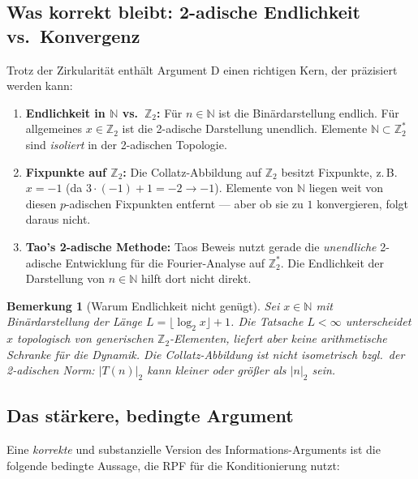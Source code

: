\documentclass[12pt,a4paper]{article}
\newtheorem{bemerkung}[definition]{Bemerkung}
\newcommand{\N}{\mathbb{N}}
\newcommand{\Ztwo}{\mathbb{Z}_2}
\begin{document}
\subsection{Was korrekt bleibt: 2-adische Endlichkeit vs.\ Konvergenz}
\label{sec:binaer:adisch}

Trotz der Zirkularität enthält Argument D einen richtigen Kern, der präzisiert
werden kann:

\begin{tcolorbox}[adisch, title={Korrekte Aussagen zur 2-adischen Struktur}]
\begin{enumerate}[label=(\arabic*), nosep]
  \item \textbf{Endlichkeit in $\N$ vs.\ $\Ztwo$:} Für $n \in \N$ ist die
    Binärdarstellung endlich. Für allgemeines $x \in \Ztwo$ ist die
    2-adische Darstellung unendlich. Elemente $\N \subset \Ztwo^*$ sind
    \emph{isoliert} in der 2-adischen Topologie.

  \item \textbf{Fixpunkte auf $\Ztwo$:} Die Collatz-Abbildung auf $\Ztwo$
    besitzt Fixpunkte, z.\,B.\ $x = -1$ (da $3\cdot(-1)+1 = -2 \to -1$).
    Elemente von $\N$ liegen weit von diesen $p$-adischen Fixpunkten entfernt
    --- aber ob sie zu $1$ konvergieren, folgt daraus nicht.

  \item \textbf{Tao's 2-adische Methode:} Taos Beweis nutzt gerade die
    \emph{unendliche} 2-adische Entwicklung für die Fourier-Analyse auf $\Ztwo^*$.
    Die Endlichkeit der Darstellung von $n \in \N$ hilft dort nicht direkt.
\end{enumerate}
\end{tcolorbox}

\begin{bemerkung}[Warum Endlichkeit nicht genügt]
Sei $x \in \N$ mit Binärdarstellung der Länge $L = \lfloor\log_2 x\rfloor + 1$.
Die Tatsache $L < \infty$ unterscheidet $x$ topologisch von generischen
$\Ztwo$-Elementen, liefert aber keine arithmetische Schranke für die Dynamik.
Die Collatz-Abbildung ist nicht isometrisch bzgl.\ der 2-adischen Norm:
$|T(n)|_2$ kann kleiner oder größer als $|n|_2$ sein.
\end{bemerkung}

\subsection{Das stärkere, bedingte Argument}
\label{sec:binaer:bedingt}

Eine \emph{korrekte} und substanzielle Version des Informations-Arguments ist
die folgende bedingte Aussage, die RPF für die Konditionierung nutzt:
\end{document}
